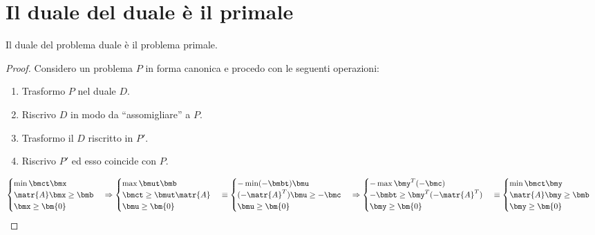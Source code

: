 \documentclass[\main/main.tex]{subfiles}
\begin{document}
\section{Il duale del duale è il primale}

\begin{theorem}
  Il duale del problema duale è il problema primale.
\end{theorem}

\begin{proof}
  Considero un problema $P$ in forma canonica e procedo con le seguenti operazioni:

  \begin{enumerate}
    \item Trasformo $P$ nel duale $D$.
    \item Riscrivo $D$ in modo da ``assomigliare'' a $P$.
    \item Trasformo il $D$ riscritto in $P'$.
    \item Riscrivo $P'$ ed esso coincide con $P$.
  \end{enumerate}

  \[
    \begin{cases}
      \min \bmct \bmx        \\
      \matr{A}\bmx \geq \bmb \\
      \bmx \geq \bm{0}
    \end{cases}
    \Rightarrow
    \begin{cases}
      \max \bmut\bmb            \\
      \bmct \geq \bmut \matr{A} \\
      \bmu \geq \bm{0}
    \end{cases}
    \equiv
    \begin{cases}
      - \min (-\bmbt)\bmu          \\
      (-\matr{A}^T)\bmu \geq -\bmc \\
      \bmu \geq \bm{0}
    \end{cases}
    \Rightarrow
    \begin{cases}
      - \max \bmy^T(-\bmc)            \\
      -\bmbt \geq \bmy^T(-\matr{A}^T) \\
      \bmy \geq \bm{0}
    \end{cases}
    \equiv
    \begin{cases}
      \min \bmct \bmy       \\
      \matr{A}\bmy\geq \bmb \\
      \bmy \geq \bm{0}
    \end{cases}
  \]

\end{proof}
\end{document}
